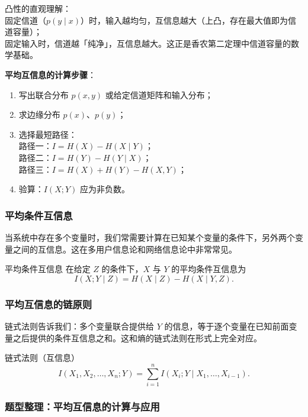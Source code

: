 \noindent 凸性的直观理解：\\
固定信道（$p(y\mid x)$）时，输入越均匀，互信息越大（上凸，存在最大值即为信道容量）；\\
固定输入时，信道越「纯净」，互信息越大。这正是香农第二定理中信道容量的数学基础。

\textbf{平均互信息的计算步骤}：
\begin{enumerate}
  \item 写出联合分布 $p(x,y)$ 或给定信道矩阵和输入分布；
  \item 求边缘分布 $p(x)$、$p(y)$；
  \item 选择最短路径：\\
    路径一：$I = H(X) - H(X\mid Y)$；\\
    路径二：$I = H(Y) - H(Y\mid X)$；\\
    路径三：$I = H(X) + H(Y) - H(X,Y)$；
  \item 验算：$I(X;Y)$ 应为非负数。
\end{enumerate}
\subsubsection{平均条件互信息}

当系统中存在多个变量时，我们常需要计算在已知某个变量的条件下，另外两个变量之间的互信息。这在多用户信息论和网络信息论中非常常见。

\begin{definitionBox}{平均条件互信息}
在给定 $Z$ 的条件下，$X$ 与 $Y$ 的平均条件互信息为
\[
I(X;Y \mid Z) = H(X \mid Z) - H(X \mid Y,Z).
\]
\end{definitionBox}
\subsubsection{平均互信息的链原则}

链式法则告诉我们：多个变量联合提供给 $Y$ 的信息，等于逐个变量在已知前面变量之后提供的条件互信息之和。这和熵的链式法则在形式上完全对应。

\begin{theoremBox}{链式法则（互信息）}
\[
I(X_1,X_2,\dots,X_n;Y) = \sum_{i=1}^{n} I(X_i;Y \mid X_1,\dots,X_{i-1}).
\]
\end{theoremBox}

\subsubsection{题型整理：平均互信息的计算与应用}

